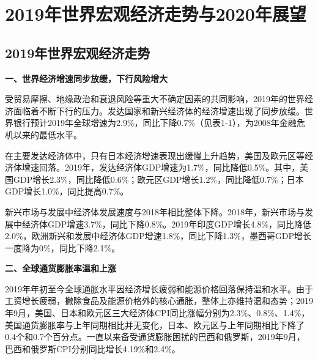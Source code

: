 \documentclass{progbookcn}
\begin{document}
\section{2019年世界宏观经济走势与2020年展望}
\subsection{2019年世界宏观经济走势}
\textbf{一、世界经济增速同步放缓，下行风险增大}

受贸易摩擦、地缘政治和衰退风险等重大不确定因素的共同影响，2019年的世界经济面临着不断下行的压力。发达国家和新兴经济体的经济增速出现了同步放缓。世界银行预计2019年全球增速为2.9\%，同比下降0.7\%（见表1-1），为2008年金融危机以来的最低水平。

在主要发达经济体中，只有日本经济增速表现出缓慢上升趋势，美国及欧元区等经济体增速回落。2019年，发达经济体GDP增速为1.7\%，同比降低0.5\%。其中，美国GDP增长2.3\%，同比降低0.6\%；欧元区GDP增长1.2\%，同比降低0.7\%；日本GDP增长1.0\%，同比提高0.7\%。

新兴市场与发展中经济体发展速度与2018年相比整体下降。2018年，新兴市场与发展中经济体GDP增速3.7\%，同比下降0.8\%。2019年印度GDP增长4.8\%，同比降低2.0\%，欧洲新兴和发展中经济体GDP增速1.8\%，同比下降1.3\%，墨西哥GDP增长一度降为0\%，同比下降2.1\%。

\textbf{二、全球通货膨胀率温和上涨}

2019年年初至今全球通胀水平因经济增长疲弱和能源价格回落保持温和水平。由于工资增长疲弱，撇除食品及能源价格外的核心通胀，整体上亦维持温和态势；2019年9月，美国、日本和欧元区三大经济体CPI同比涨幅分别为2.3\%、0.8\%、1.4\%，美国通货膨胀率与上年同期相比并无变化，日本、欧元区与上年同期相比下降了0.4个和0.7个百分点。一直以来备受通货膨胀困扰的巴西和俄罗斯，2019年9月，巴西和俄罗斯CPI分别同比增长4.19\%和2.4\%。
\end{document}
